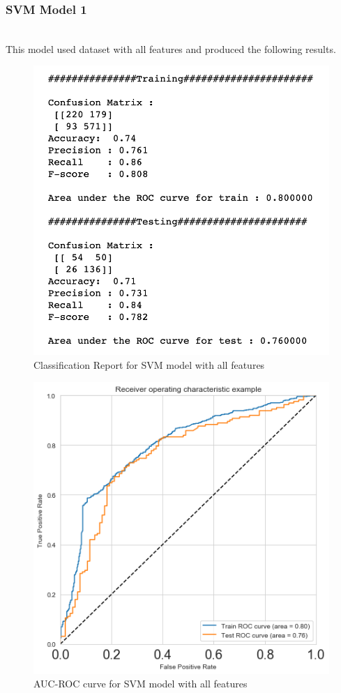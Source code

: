 \documentclass[format=sigconf]{acmart}
\begin{document}
\subsubsection{SVM Model 1}
\hfill\\
This model used dataset with all features and produced the following results.
\begin{figure}[H]
    \centering
    \includegraphics[scale=0.50]{images/SVM_Model_1_results.png}
    \caption{Classification Report for SVM model with all features}
    \label{fig:svmmodel1}
\end{figure}

\begin{figure}[H]
    \centering
    \includegraphics[scale=0.50]{images/AUC_ROC_SVM_Model_1.png}
    \caption{AUC-ROC curve for SVM model with all features}
    \label{fig:aucrocmodel1}
\end{figure}
\end{document}
